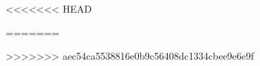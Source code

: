 



\tableofcontents
\newpage



<<<<<<< HEAD

=======

>>>>>>> aec54ca5538816e0b9c56408dc1334cbee9e6e9f



